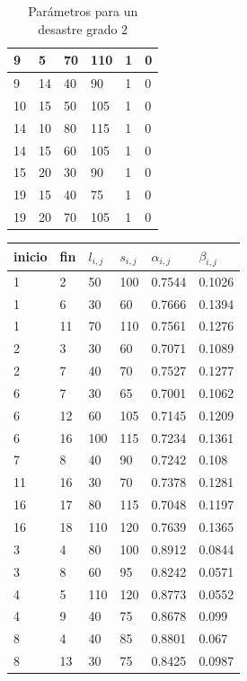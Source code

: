 \documentclass[letter, 10pt]{article}
\begin{document}
\begin{table}[H]
\begin{tabular}{|l|l|l|l|l|l|}
9 & 5 & 70 & 110 & 1 & 0 \\ \hline
9 & 14 & 40 & 90 & 1 & 0 \\ \hline
10 & 15 & 50 & 105 & 1 & 0 \\ \hline
14 & 10 & 80 & 115 & 1 & 0 \\ \hline
14 & 15 & 60 & 105 & 1 & 0 \\ \hline
15 & 20 & 30 & 90 & 1 & 0 \\ \hline
19 & 15 & 40 & 75 & 1 & 0 \\ \hline
19 & 20 & 70 & 105 & 1 & 0 \\ \hline
\end{tabular}
\caption{Parámetros para un desastre grado 2}
\label{grade2}
\end{table}

\begin{table}[H]
\centering
\begin{tabular}{|l|l|l|l|l|l|}
\hline
inicio & fin & $l_{i,j}$ & $s_{i,j}$ & $\alpha_{i,j}$ & $\beta_{i,j}$ \\ \hline
1 & 2 & 50 & 100 & 0.7544 & 0.1026 \\ \hline
1 & 6 & 30 & 60 & 0.7666 & 0.1394 \\ \hline
1 & 11 & 70 & 110 & 0.7561 & 0.1276 \\ \hline
2 & 3 & 30 & 60 & 0.7071 & 0.1089 \\ \hline
2 & 7 & 40 & 70 & 0.7527 & 0.1277 \\ \hline
6 & 7 & 30 & 65 & 0.7001 & 0.1062 \\ \hline
6 & 12 & 60 & 105 & 0.7145 & 0.1209 \\ \hline
6 & 16 & 100 & 115 & 0.7234 & 0.1361 \\ \hline
7 & 8 & 40 & 90 & 0.7242 & 0.108 \\ \hline
11 & 16 & 30 & 70 & 0.7378 & 0.1281 \\ \hline
16 & 17 & 80 & 115 & 0.7048 & 0.1197 \\ \hline
16 & 18 & 110 & 120 & 0.7639 & 0.1365 \\ \hline
3 & 4 & 80 & 100 & 0.8912 & 0.0844 \\ \hline
3 & 8 & 60 & 95 & 0.8242 & 0.0571 \\ \hline
4 & 5 & 110 & 120 & 0.8773 & 0.0552 \\ \hline
4 & 9 & 40 & 75 & 0.8678 & 0.099 \\ \hline
8 & 4 & 40 & 85 & 0.8801 & 0.067 \\ \hline
8 & 13 & 30 & 75 & 0.8425 & 0.0987 \\ \hline

\end{tabular}
\end{table}
\end{document}
